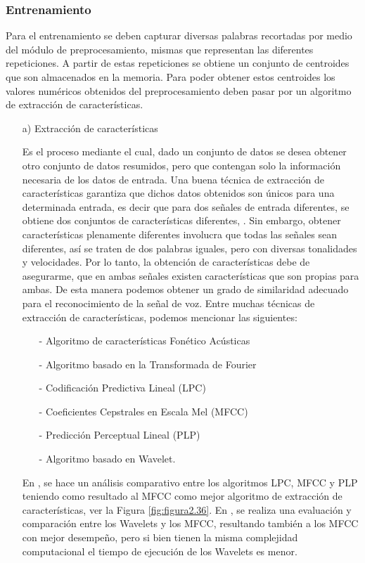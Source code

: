 \newpage
\subsubsection{Entrenamiento}
Para el entrenamiento se deben capturar diversas palabras recortadas por medio del módulo de preprocesamiento, mismas que representan las diferentes repeticiones. A partir de estas repeticiones se obtiene un conjunto de centroides que son almacenados en la memoria. Para poder obtener estos centroides los valores numéricos obtenidos del preprocesamiento deben pasar por un algoritmo de extracción de características.
\begin{enumerate}
\item[a)]Extracción de características
\par
Es el proceso mediante el cual, dado un conjunto de datos se desea obtener otro conjunto de datos resumidos, pero que contengan solo la información necesaria de los datos de entrada. Una buena técnica de extracción de características garantiza que dichos datos obtenidos son únicos para una determinada entrada, es decir que para dos señales de entrada diferentes, se obtiene dos conjuntos de características diferentes, \cite{claudio}.
\vskip 0.5cm
Sin embargo, obtener características plenamente diferentes involucra que todas las señales sean diferentes, así se traten de dos palabras iguales, pero con diversas tonalidades y velocidades. Por lo tanto, la obtención de características debe de asegurarme, que en ambas señales existen características que son propias para ambas. De esta manera podemos obtener un grado de similaridad adecuado para el reconocimiento de la señal de voz.
\vskip 0.5cm
Entre muchas técnicas de extracción de características, podemos mencionar las siguientes:
\begin{enumerate}
\item[-]Algoritmo de características Fonético Acústicas
\item[-]Algoritmo basado en la Transformada de Fourier
\item[-]Codificación Predictiva Lineal (LPC)
\item[-]Coeficientes Cepstrales en Escala Mel (MFCC)
\item[-]Predicción Perceptual Lineal (PLP)
\item[-]Algoritmo basado en Wavelet.
\end{enumerate}

En \citep{unam}, se hace un análisis comparativo entre los algoritmos LPC, MFCC y PLP teniendo como resultado al MFCC como mejor algoritmo de extracción de características, ver la Figura \ref{fig:figura2.36}. En \citep{orlando}, se realiza una evaluación y comparación entre los Wavelets y los MFCC, resultando también a los MFCC con mejor desempeño, pero si bien tienen la misma complejidad computacional el tiempo de ejecución de los Wavelets es menor.


\end{enumerate}
